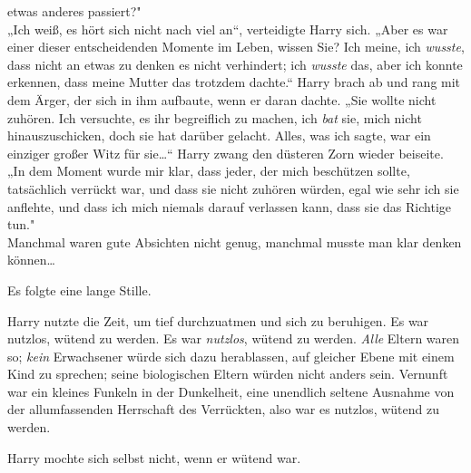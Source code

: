 {etwas anderes passiert?"\\ „Ich weiß, es hört sich nicht nach viel an“, verteidigte Harry sich. „Aber es war einer dieser entscheidenden Momente im Leben, wissen Sie? Ich meine, ich \emph{wusste}, dass nicht an etwas zu denken es nicht verhindert; ich \emph{wusste} das, aber ich konnte erkennen, dass meine Mutter das trotzdem dachte.“ Harry brach ab und rang mit dem Ärger, der sich in ihm aufbaute, wenn er daran dachte. „Sie wollte nicht zuhören. Ich versuchte, es ihr begreiflich zu machen, ich \emph{bat} sie, mich nicht hinauszuschicken, doch sie hat darüber gelacht. Alles, was ich sagte, war ein einziger großer Witz für sie…“ Harry zwang den düsteren Zorn wieder beiseite. „In dem Moment wurde mir klar, dass jeder, der mich beschützen sollte, tatsächlich verrückt war, und dass sie nicht zuhören würden, egal wie sehr ich sie anflehte, und dass ich mich niemals darauf verlassen kann, dass sie das Richtige tun."\\ Manchmal waren gute Absichten nicht genug, manchmal musste man klar denken können…

Es folgte eine lange Stille.

Harry nutzte die Zeit, um tief durchzuatmen und sich zu beruhigen. Es war nutzlos, wütend zu werden. Es war \emph{nutzlos}, wütend zu werden. \emph{Alle} Eltern waren so; \emph{kein} Erwachsener würde sich dazu herablassen, auf gleicher Ebene mit einem Kind zu sprechen; seine biologischen Eltern würden nicht anders sein. Vernunft war ein kleines Funkeln in der Dunkelheit, eine unendlich seltene Ausnahme von der allumfassenden Herrschaft des Verrückten, also war es nutzlos, wütend zu werden.

Harry mochte sich selbst nicht, wenn er wütend war.

}
